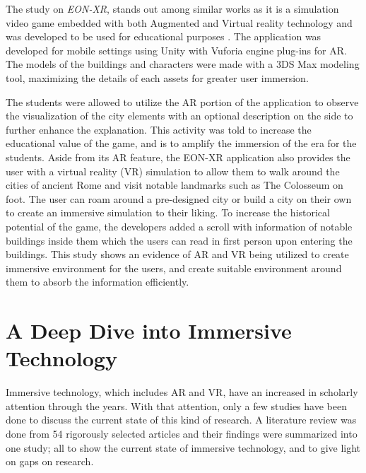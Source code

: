 The study on \textit{EON-XR}, stands out among similar works as it is a simulation video game embedded with both Augmented and Virtual reality technology and was developed to be used for educational purposes \cite{ARVRRome}. The application was developed for mobile settings using Unity with Vuforia engine plug-ins for AR. The models of the buildings and characters were made with a 3DS Max modeling tool, maximizing the details of each assets for greater user immersion. 

The students were allowed to utilize the AR portion of the application to observe the visualization of the city elements with an optional description on the side to further enhance the explanation. This activity was told to increase the educational value of the game, and is to amplify the immersion of the era for the students. Aside from its AR feature, the EON-XR application also provides the user with a virtual reality (VR) simulation to allow them to walk around the cities of ancient Rome and visit notable landmarks such as The Colosseum on foot. The user can roam around a pre-designed city or build a city on their own to create an immersive simulation to their liking. To increase the historical potential of the game, the developers added a scroll with information of notable buildings inside them which the users can read in first person upon entering the buildings. This study shows an evidence of AR and VR being utilized to create immersive environment for the users, and create suitable environment around them to absorb the information efficiently.


\section{A Deep Dive into Immersive Technology}
Immersive technology, which includes AR and VR, have an increased in scholarly attention through the years. With that attention, only a few studies have been done to discuss the current state of this kind of research. A literature review was done from 54 rigorously selected articles and their findings were summarized into one study; all to show the current state of immersive technology, and to give light on gaps on research.
















